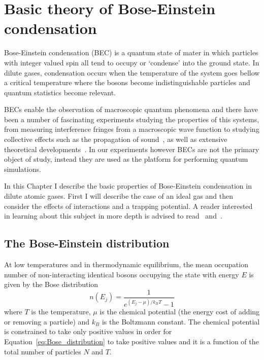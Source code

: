
\renewcommand{\thechapter}{2}

\chapter{Basic theory of Bose-Einstein condensation}

Bose-Einstein condensation (BEC) is a quantum state of mater in which particles with integer valued spin all tend to occupy or `condense' into the ground state. In dilute gases, condensation occurs when the temperature of the system goes bellow a critical temperature where the bosons become indistinguishable particles and quantum statistics become relevant. 

BECs enable the observation of macroscopic quantum phenomena and there have been a number of fascinating experiments studying the properties of this systems, from measuring interference fringes from a macroscopic wave function to studying collective effects such as the propagation of sound~\cite{ketterle_w._making_1999}, as well as extensive theoretical developments~\cite{dalfovo_theory_1999}. In our experiments however BECs are not the primary object of study, instead they are used as the platform for performing quantum simulations. 

In this Chapter I describe the basic properties of Bose-Einstein condensation in dilute atomic gases. First I will describe the case of an ideal gas and then consider the effects of interactions and a trapping potential. A reader interested in learning about this subject in more depth is advised to read~\cite{Pethick} and~\cite{noauthor_bose-einstein_2003}.

\section{The Bose-Einstein distribution}

At low temperatures and in thermodynamic equilibrium, the mean occupation number of non-interacting identical bosons occupying the state with energy $E$ is given by the Bose distribution
%
\begin{equation}
	n(E_j)=\frac{1}{e^{(E_j-\mu)/k_BT}-1}
	\label{eq:Bose_distribution}	
\end{equation}
%
where $T$ is the temperature, $\mu$ is the chemical potential (the energy cost of adding or removing a particle) and $k_B$ is the Boltzmann constant. The chemical potential is constrained to take only positive values in order for Equation~\ref{eq:Bose_distribution} to take positive values and it is a function of the total number of particles $N$ and $T$.

